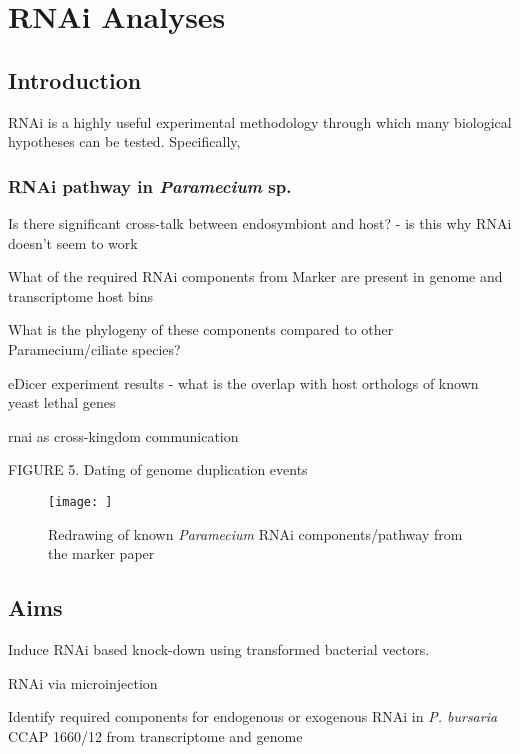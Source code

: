 \graphicspath{{chapters/7.Chapter_5/figures}}

\chapter{RNAi Analyses}


\section{Introduction}

RNAi is a highly useful experimental methodology through which
many biological hypotheses can be tested.
Specifically, 






\subsection{RNAi pathway in \textit{Paramecium} sp.}

Is there significant cross-talk between endosymbiont and host? - is this why RNAi doesn't seem to work

What of the required RNAi components from Marker are present in genome and transcriptome host bins

What is the phylogeny of these components compared to other Paramecium/ciliate species?

eDicer experiment results - what is the overlap with host orthologs of known yeast lethal genes

rnai as cross-kingdom communication \citep{Weiberg2015}



FIGURE 5. Dating of genome duplication events



\begin{figure}
    \texttt{[image: ]}
    \caption{Redrawing of known \textit{Paramecium} RNAi components/pathway from the marker paper}
    \label{fig:rnai_components}
\end{figure}


\section{Aims}

Induce RNAi based knock-down using transformed bacterial vectors.

RNAi via microinjection

Identify required components for endogenous or exogenous RNAi in \textit{P. bursaria} CCAP 1660/12 from transcriptome and genome

